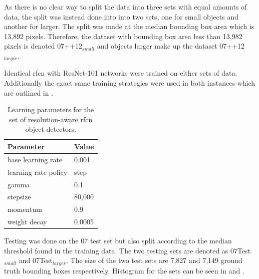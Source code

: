 As there is no clear way to split the data into three sets with equal amounts of data, the split was instead done into into two sets, one for small objects and another for larger. The split was made at the median bounding box area which is 13,892 pixels. Therefore, the dataset with bounding box area less than 13,982 pixels is denoted 07++12$_{small}$ and objects larger make up the dataset 07++12$_{larger}$.

Identical \gls{rfcn} with ResNet-101 networks were trained on either sets of data. Additionally the exact same training strategies were used in both instances which are outlined in .

\begin{table}[h]
\centering
\caption{Learning parameters for the set of resolution-aware \gls{rfcn} object detectors.}
\label{tab:resawareparams}
\begin{tabular}{|l|l|}
\hline
\textbf{Parameter}            & \textbf{Value}  \\ \hline
base learning rate   & 0.001  \\ \hline
learning rate policy & step   \\ \hline
gamma                & 0.1    \\ \hline
stepsize             & 80,000 \\ \hline
momentum             & 0.9    \\ \hline
weight decay         & 0.0005 \\ \hline
\end{tabular}
\end{table}

Testing was done on the 07 test set but also split according to the median threshold found in the training data. The two testing sets are denoted as 07Test$_{small}$ and 07Test$_{larger}$. The size of the two test sets are 7,827 and 7,149 ground truth bounding boxes respectively. Histogram for the sets can be seen in  and .


